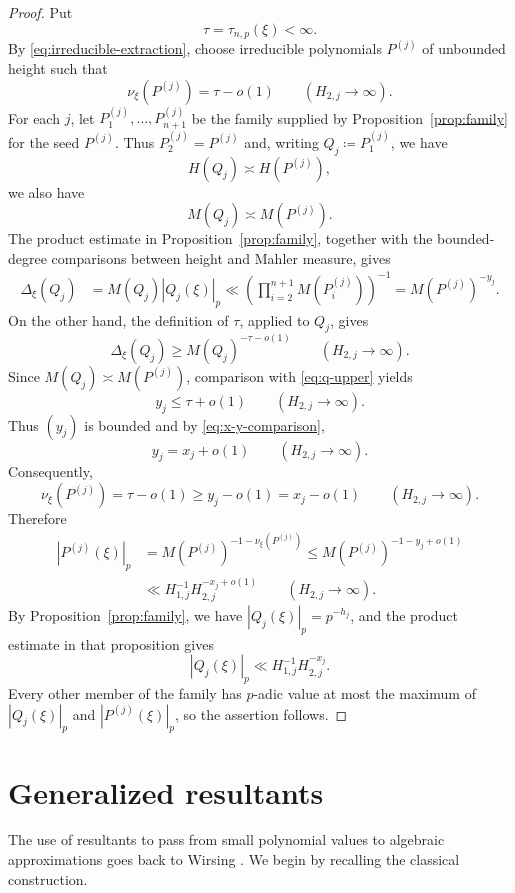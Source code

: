 \documentclass[12pt,reqno]{amsart}
\theoremstyle{definition}
\theoremstyle{remark}
\begin{document}
\begin{proof}
Put
$$
\tau=\tau_{n,p}(\xi)<\infty.
$$
By \eqref{eq:irreducible-extraction}, choose irreducible polynomials
$P^{(j)}$ of unbounded height such that
$$
\nu_\xi(P^{(j)})=\tau-o(1)\qquad(H_{2,j}\to\infty).
$$
For each $j$, let $P_1^{(j)},\ldots,P_{n+1}^{(j)}$ be the family supplied by
Proposition~\ref{prop:family} for the seed $P^{(j)}$. Thus
$P_2^{(j)}=P^{(j)}$ and, writing $Q_j\coloneqq P_1^{(j)}$, we have
$$
H(Q_j)\asymp H(P^{(j)}),
$$
we also have
$$
M(Q_j)\asymp M(P^{(j)}).
$$
The product estimate in Proposition~\ref{prop:family}, together with the bounded-degree comparisons between height and Mahler measure, gives
\begin{equation}\label{eq:q-upper}
\begin{aligned}
\Delta_\xi(Q_j)
&=M(Q_j)|Q_j(\xi)|_p \ll
\left(\prod_{i=2}^{n+1}M(P_i^{(j)})\right)^{-1}=M(P^{(j)})^{-y_j}.
\end{aligned}
\end{equation}
On the other hand, the definition of $\tau$, applied to $Q_j$, gives
$$
\Delta_\xi(Q_j)\geq M(Q_j)^{-\tau-o(1)}
\qquad(H_{2,j}\to\infty).
$$
Since $M(Q_j)\asymp M(P^{(j)})$, comparison with
\eqref{eq:q-upper} yields
$$
y_j\leq\tau+o(1)\qquad(H_{2,j}\to\infty).
$$
Thus $(y_j)$ is bounded and by \eqref{eq:x-y-comparison}, 
$$
y_j=x_j+o(1)\qquad(H_{2,j}\to\infty).
$$
Consequently,
$$
\nu_\xi(P^{(j)})=\tau-o(1)
\geq y_j-o(1)=x_j-o(1)
\qquad(H_{2,j}\to\infty).
$$
Therefore
$$
\begin{aligned}
|P^{(j)}(\xi)|_p
&=M(P^{(j)})^{-1-\nu_\xi(P^{(j)})}
\leq M(P^{(j)})^{-1-y_j+o(1)}\\
&\ll H_{1,j}^{-1}H_{2,j}^{-x_j+o(1)}
\qquad(H_{2,j}\to\infty).
\end{aligned}
$$
By Proposition~\ref{prop:family}, we have $|Q_j(\xi)|_p=p^{-h_j}$, and the
product estimate in that proposition gives
$$
|Q_j(\xi)|_p\ll H_{1,j}^{-1}H_{2,j}^{-x_j}.
$$
Every other member of the family has $p$-adic value at most the maximum of
$|Q_j(\xi)|_p$ and $|P^{(j)}(\xi)|_p$, so the assertion follows.
\end{proof}

\bigskip
\section{\bf Generalized resultants}
\bigskip

The use of resultants to pass from small polynomial values to algebraic
approximations goes back to Wirsing \cite{Wirsing}. We begin by recalling the
classical construction.
\end{document}
